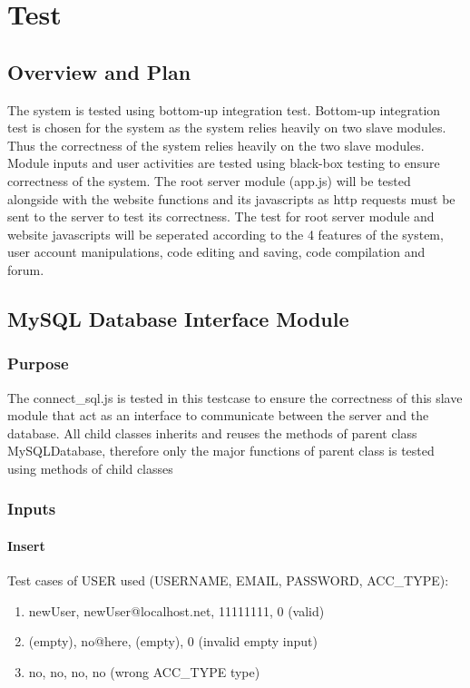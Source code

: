 \chapter{Test}
\section{Overview and Plan}
The system is tested using bottom-up integration test. Bottom-up integration test is chosen for the system as the system relies heavily on two slave modules. Thus the correctness of the system relies heavily on the two slave modules. Module inputs and user activities are tested using black-box testing to ensure correctness of the system. The root server module (app.js) will be tested alongside with the website functions and its javascripts as http requests must be sent to the server to test its correctness. The test for root server module and website javascripts will be seperated according to the 4 features of the system, user account manipulations, code editing and saving, code compilation and forum.

\section{MySQL Database Interface Module}
\subsection{Purpose}
The connect\_sql.js is tested in this testcase to ensure the correctness of this slave module that act as an interface to communicate between the server and the database. All child classes inherits and reuses the methods of parent class MySQLDatabase, therefore only the major functions of parent class is tested using methods of child classes

\subsection{Inputs}
\subsubsection{Insert}
Test cases of USER used (USERNAME, EMAIL, PASSWORD, ACC\_TYPE):
\begin{enumerate}
  \item newUser, newUser@localhost.net, 11111111, 0 (valid)
  \item (empty), no@here, (empty), 0 (invalid empty input)
  \item no, no, no, no (wrong ACC\_TYPE type)
\end{enumerate}

